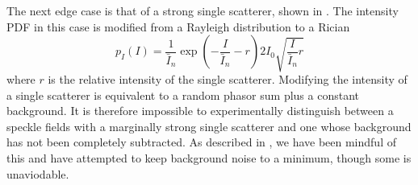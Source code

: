 The next edge case is that of a strong single scatterer, shown in 
.  The intensity PDF in this case is modified
from a Rayleigh distribution to a Rician~\cite{goodman2007speckle} 
\begin{equation}
p_I(I) = \frac{1}{\bar{I}_n} \exp\left(-\frac{I}{\bar{I}_n} - r\right) 2 I_0
\sqrt{\frac{I}{\bar{I}_n} r}
\label{ricedpf}
\end{equation}
where $r$ is the relative intensity of the single scatterer.  Modifying the
intensity of a single scatterer is equivalent to a random phasor sum plus a
constant background.  It is therefore impossible to experimentally
distinguish between a speckle fields with a marginally strong single
scatterer and one whose background has not been completely subtracted.  
As described in , we have been mindful of this
and have attempted to keep background noise to a minimum, though some is
unaviodable.
